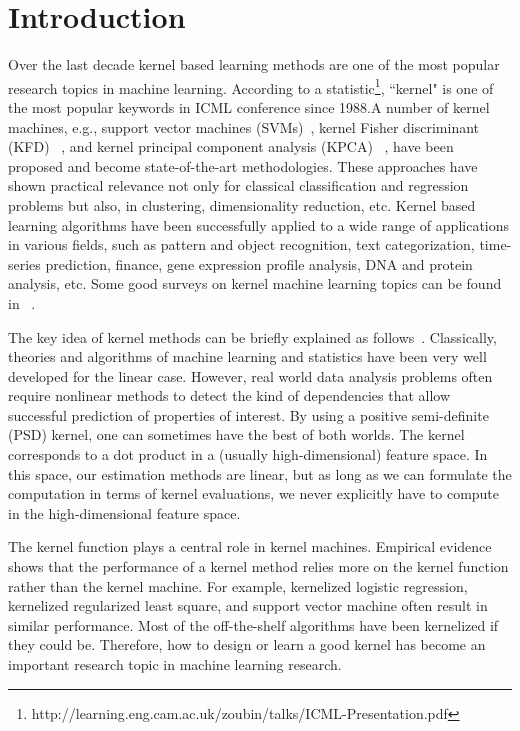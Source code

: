 \chapter{Introduction} \label{chp:introduction}

Over the last decade kernel based learning methods are one of the most popular research topics in machine learning. According to a statistic\footnote{http://learning.eng.cam.ac.uk/zoubin/talks/ICML-Presentation.pdf}, ``kernel" is one of the most popular keywords in ICML conference since 1988.A number of kernel machines, e.g., support vector machines (SVMs)~\cite{ml/CortesV95}, kernel Fisher discriminant (KFD) ~\cite{nn/MikaRWSM99}, and kernel
principal component analysis (KPCA) ~\cite{neco/ScholkopfSM98}, have been proposed and become state-of-the-art methodologies. These approaches have shown practical relevance not only for classical classification and regression problems but also, in clustering, dimensionality reduction, etc. Kernel based learning algorithms have been successfully applied to a wide range of applications in various fields, such as pattern and object recognition, text categorization, time-series prediction, finance, gene expression profile analysis, DNA and protein analysis, etc. Some good surveys on kernel machine learning topics can be found in ~\cite{datamine/Burges98,tnn/MullerM01,Scholkopf2002,ss/MoguerzaM06}.

The key idea of kernel methods can be briefly explained as follows~\cite{as/HofmannSAS08}. Classically, theories and algorithms of machine learning and statistics have been very well developed for the linear case. However, real world data analysis problems often require nonlinear methods to detect the kind of dependencies that allow successful prediction of properties of interest. By using a positive semi-definite (PSD) kernel, one can sometimes have the best of both worlds. The kernel corresponds to a dot product in a (usually high-dimensional) feature space. In this space, our estimation methods are linear, but as long as we can formulate the computation in terms of kernel evaluations, we never explicitly have to compute in the high-dimensional feature space.

The kernel function plays a central role in kernel machines. Empirical evidence shows that the performance of a kernel method relies more on the kernel function rather than the kernel machine. For example, kernelized logistic regression, kernelized regularized least square, and support vector machine often result in similar performance. Most of the off-the-shelf algorithms have been kernelized if they could be. Therefore, how to design or learn a good kernel has become an important research topic in machine learning research.

